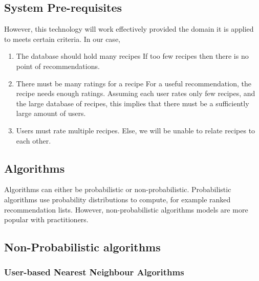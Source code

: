 \subsection{System Pre-requisites}

However, this technology will work effectively provided the domain it is applied to meets certain criteria. In our case, 

\begin{enumerate}
\item	The database should hold many recipes 
If too few recipes then there is no point of recommendations.

\item	There must be many ratings for a recipe
For a useful recommendation, the recipe needs enough ratings. Assuming each user rates only few recipes, and the large database of recipes, this implies that there must be a sufficiently large amount of users.

\item	Users must rate multiple recipes.
Else, we will be unable to relate recipes to each other.

\end{enumerate}

\subsection{Algorithms}

Algorithms can either be probabilistic or non-probabilistic. Probabilistic algorithms use probability distributions to compute, for example ranked recommendation lists. However, non-probabilistic algorithms models are more popular with practitioners. 

\subsection{Non-Probabilistic algorithms}

\subsubsection{User-based Nearest Neighbour Algorithms}



